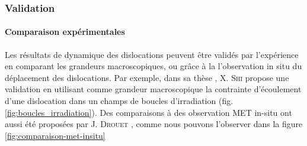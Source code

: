 \documentclass[11pt,class=article,float=false,crop=false]{standalone}
\begin{document}
\subsubsection{Validation}

\paragraph{Comparaison expérimentales}

Les résultats de dynamique des dislocations peuvent être validés par l'expérience en comparant les grandeurs macroscopiques, ou grâce à la l'observation in situ du déplacement des dislocations.
Par exemple, dans sa thèse , X. \textsc{Shi} propose une validation en utilisant comme grandeur macroscopique la contrainte d'écoulement d'une dislocation dans un champs de boucles d'irradiation (fig. \ref{fig:boucles_irradiation}).
Des comparaisons à des observation MET in-situ ont aussi été proposées par J. \textsc{Drouet} , comme nous pouvons l'observer dans la figure \ref{fig:comparaison-met-insitu}
\end{document}
